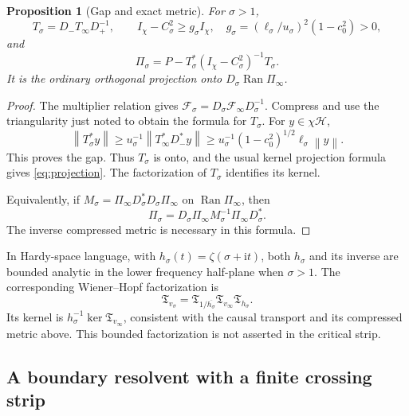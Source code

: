 \documentclass[11pt]{article}
\numberwithin{equation}{section}
\newtheorem{proposition}[theorem]{Proposition}
\theoremstyle{definition}
\theoremstyle{remark}
\newcommand{\HH}{\mathcal H}
\newcommand{\Ran}{\operatorname{Ran}}
\newcommand{\ii}{\mathrm i}
\newcommand{\Id}{I}
\newcommand{\Fcal}{\mathcal F}
\newcommand{\norm}[1]{\left\lVert #1\right\rVert}
\begin{document}
\begin{proposition}[Gap and exact metric]\label{prop:gap}
For \(\sigma>1\),
\begin{equation}\label{eq:gap}
T_\sigma=D_-T_\infty D_+^{-1},\qquad
\Id_\chi-C_\sigma^2\ge
g_\sigma\Id_\chi,\quad
g_\sigma=(\ell_\sigma/u_\sigma)^2(1-c_0^2)>0,
\end{equation}
and
\begin{equation}\label{eq:projection}
\Pi_\sigma=P-T_\sigma^*(\Id_\chi-C_\sigma^2)^{-1}T_\sigma.
\end{equation}
It is the ordinary orthogonal projection onto
\(D_\sigma\Ran\Pi_\infty\).
\end{proposition}
\begin{proof}
The multiplier relation gives
\(\Fcal_\sigma=D_\sigma\Fcal_\infty D_\sigma^{-1}\).
Compress and use the triangularity just noted to obtain
the formula for \(T_\sigma\).
For \(y\in\chi\HH\),
\[
\norm{T_\sigma^*y}
\ge u_\sigma^{-1}\norm{T_\infty^*D_-^*y}
\ge u_\sigma^{-1}(1-c_0^2)^{1/2}\ell_\sigma\norm y.
\]
This proves the gap. Thus \(T_\sigma\) is onto, and the usual kernel
projection formula gives \eqref{eq:projection}.
The factorization of \(T_\sigma\) identifies its kernel.

Equivalently, if
\(M_\sigma=\Pi_\infty D_\sigma^*D_\sigma\Pi_\infty\)
on \(\Ran\Pi_\infty\), then
\[
\Pi_\sigma=D_\sigma\Pi_\infty M_\sigma^{-1}
\Pi_\infty D_\sigma^*.
\]
The inverse compressed metric is necessary in this formula.
\end{proof}

In Hardy-space language, with \(h_\sigma(t)=\zeta(\sigma+\ii t)\),
both \(h_\sigma\) and its inverse are bounded analytic in the lower
frequency half-plane when \(\sigma>1\). The corresponding
Wiener--Hopf factorization is
\[
\mathfrak T_{v_\sigma}
=\mathfrak T_{1/\overline{h_\sigma}}
\mathfrak T_{v_\infty}\mathfrak T_{h_\sigma}.
\]
Its kernel is \(h_\sigma^{-1}\ker\mathfrak T_{v_\infty}\), consistent
with the causal transport and its compressed metric above. This bounded
factorization is not asserted in the critical strip.

\subsection{A boundary resolvent with a finite crossing strip}
\end{document}

